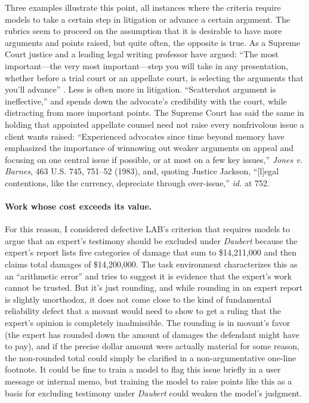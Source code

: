 \documentclass[11pt]{article}
\begin{document}
Three examples illustrate this point, all instances where the criteria require models to take a certain step in litigation or advance a certain argument. The rubrics seem to proceed on the assumption that it is desirable to have more arguments and points raised, but quite often, the opposite is true. As a Supreme Court justice and a leading legal writing professor have argued: ``The most important---the very most important---step you will take in any presentation, whether before a trial court or an appellate court, is selecting the arguments that you'll advance'' \citep[\S~12]{scaliaGarner}. Less is often more in litigation. ``Scattershot argument is ineffective,'' \citep[\S~12]{scaliaGarner} and spends down the advocate's credibility with the court, while distracting from more important points. The Supreme Court has said the same in holding that appointed appellate counsel need not raise every nonfrivolous issue a client wants raised: ``Experienced advocates since time beyond memory have emphasized the importance of winnowing out weaker arguments on appeal and focusing on one central issue if possible, or at most on a few key issues,'' \emph{Jones v. Barnes}, 463 U.S. 745, 751--52 (1983), and, quoting Justice Jackson, ``[l]egal contentions, like the currency, depreciate through over-issue,'' \emph{id.} at 752.

\paragraph{Work whose cost exceeds its value.} For this reason, I considered defective LAB's criterion that requires models to argue that an expert's testimony should be excluded under \emph{Daubert} because the expert's report lists five categories of damage that sum to \$14,211,000 and then claims total damages of \$14,200,000. The task environment characterizes this as an ``arithmetic error'' and tries to suggest it is evidence that the expert's work cannot be trusted. But it's just rounding, and while rounding in an expert report is slightly unorthodox, it does not come close to the kind of fundamental reliability defect that a movant would need to show to get a ruling that the expert's opinion is completely inadmissible. The rounding is in movant's favor (the expert has rounded down the amount of damages the defendant might have to pay), and if the precise dollar amount were actually material for some reason, the non-rounded total could simply be clarified in a non-argumentative one-line footnote. It could be fine to train a model to flag this issue briefly in a user message or internal memo, but training the model to raise points like this as a basis for excluding testimony under \emph{Daubert} could weaken the model's judgment.
\end{document}
